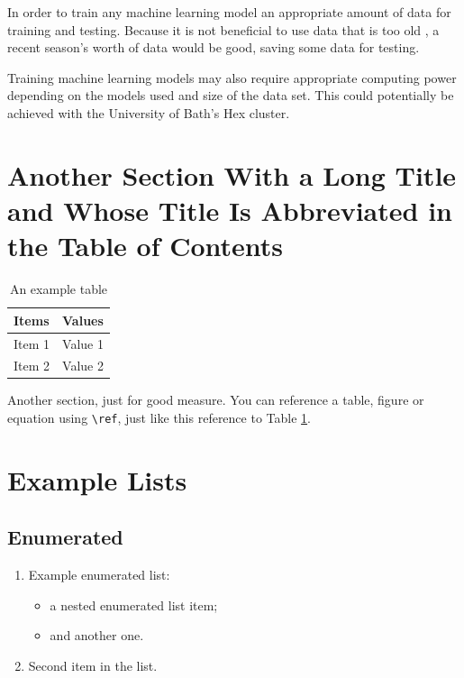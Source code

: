 \documentclass[12pt,a4paper]{report}
\begin{document}
In order to train any machine learning model an appropriate amount of data for training and testing. 
Because it is not beneficial to use data that is too old \citep{horvat2020}, a recent season's worth of data would be good, saving some data for testing. 

Training machine learning models may also require appropriate computing power depending on the models used and size of the data set. 
This could potentially be achieved with the University of Bath's Hex cluster.

\section[Short Section Title]{Another Section With a Long Title and Whose Title Is Abbreviated in the Table of Contents}

\begin{table}[htb]
\caption{An example table}
\bigskip
\begin{center}
\label{Example-Table}
\begin{tabular}{|l|l|}
\hline
Items & Values \\
\hline
\hline
Item 1 & Value 1 \\
Item 2 & Value 2 \\
\hline
\end{tabular}
\end{center}
\end{table}

Another section, just for good measure. You can reference a table, figure or equation using \verb|\ref|, just like this reference to Table \ref{Example-Table}.

\section{Example Lists}

\subsection{Enumerated}

\begin{enumerate}
\item Example enumerated list:
  \begin{itemize}
  \item a nested enumerated list item;
  \item and another one.
  \end{itemize}
\item Second item in the list.
\end{enumerate}
\end{document}
